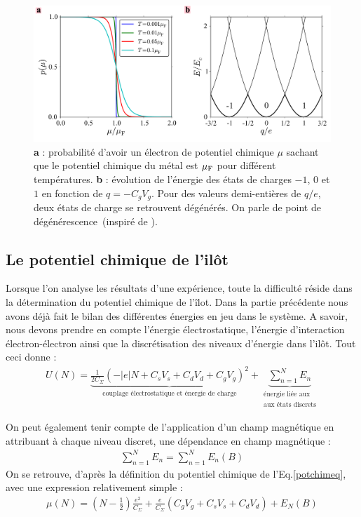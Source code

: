 \begin{figure}
\centering \includegraphics[scale=0.45]{Annexe2/figure2/figure2.pdf} 
\caption{ \textbf{a} : probabilité d'avoir un électron de potentiel chimique $\mu$ sachant que le potentiel chimique du métal est $\mu_{\rm{F}}$ pour différent températures. \textbf{b} : évolution de l'énergie des états de charges $-1$, $0$ et $1$ en fonction de $q = -C_gV_g$. Pour des valeurs demi-entières de $q/e$, deux états de charge se retrouvent dégénérés. On parle de point de dégénérescence~(inspiré de \cite{NazaBook}).}
\label{distrib_fermi}
\end{figure}



\subsection{Le potentiel chimique de l'il\^ot}
Lorsque l'on analyse les résultats d'une expérience, toute la difficulté réside dans la détermination du potentiel chimique de l'\^ilot. Dans la partie précédente nous avons déjà fait le bilan des différentes énergies en jeu dans le système. A savoir, nous devons prendre en compte l'énergie électrostatique, l'énergie d'interaction électron-électron ainsi que la discrétisation des niveaux d'énergie dans l'il\^ot. Tout ceci donne :
\begin{eqnarray}
U(N) = \underbrace{\frac{1}{2C_{\Sigma}} (-|e|N + C_sV_s + C_dV_d + C_gV_g)^2}_{\text{couplage électrostatique et énergie de charge}}
+ 
\underbrace{\sum_{n=1}^{N} E_n}_{\substack{\text{énergie liée aux} \\\text{aux états discrets}}}
\end{eqnarray}

On peut également tenir compte de l'application d'un champ magnétique en attribuant à chaque niveau discret, une dépendance en champ magnétique :
\begin{eqnarray}
\sum_{n=1}^N E_n = \sum_{n=1}^N E_n(B) \nonumber
\end{eqnarray}
On se retrouve, d'après la définition du potentiel chimique de l'Eq.\ref{potchimeq}, avec une expression relativement simple :
\begin{eqnarray}
\mu(N) = (N-\frac{1}{2})\frac{e^2}{C_{\Sigma}}
+ 
\frac{e}{C_{\Sigma}}(C_gV_g + C_sV_s + C_dV_d)
+
E_N(B)
\end{eqnarray}

